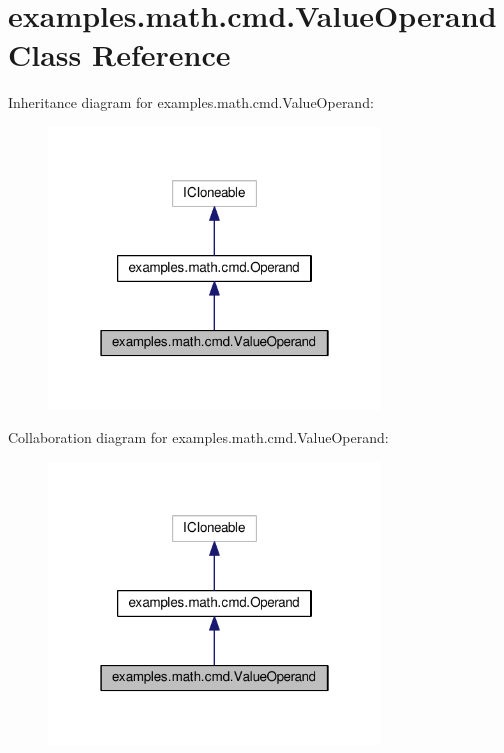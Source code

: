 \hypertarget{classexamples_1_1math_1_1cmd_1_1_value_operand}{\section{examples.\-math.\-cmd.\-Value\-Operand Class Reference}
\label{classexamples_1_1math_1_1cmd_1_1_value_operand}
}


Inheritance diagram for examples.\-math.\-cmd.\-Value\-Operand\-:
\nopagebreak
\begin{figure}[H]
\begin{center}
\leavevmode
\includegraphics[width=250pt]{classexamples_1_1math_1_1cmd_1_1_value_operand__inherit__graph}
\end{center}
\end{figure}


Collaboration diagram for examples.\-math.\-cmd.\-Value\-Operand\-:
\nopagebreak
\begin{figure}[H]
\begin{center}
\leavevmode
\includegraphics[width=250pt]{classexamples_1_1math_1_1cmd_1_1_value_operand__coll__graph}
\end{center}
\end{figure}
